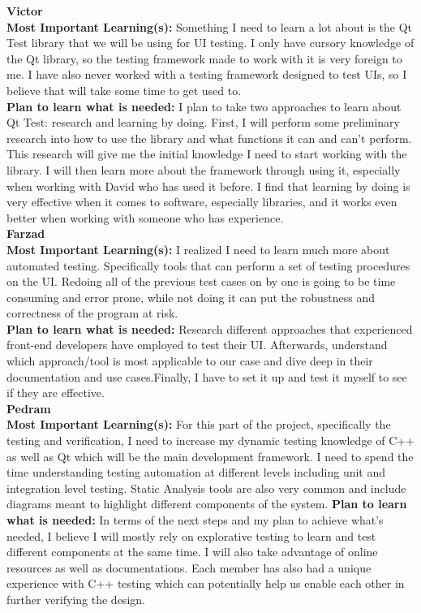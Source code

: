 \documentclass[12pt, titlepage]{article}
\begin{document}
\noindent\textbf{Victor}\\
\textbf{Most Important Learning(s):} Something I need to learn a lot about is the Qt Test library that we will be using for UI testing. I only have cursory knowledge of the Qt library, so the testing framework made to work with it is very foreign to me. I have also never worked with a testing framework designed to test UIs, so I believe that will take some time to get used to.\\
\textbf{Plan to learn what is needed:} I plan to take two approaches to learn about Qt Test: research and learning by doing. First, I will perform some preliminary research into how to use the library and what functions it can and can't perform. This research will give me the initial knowledge I need to start working with the library. I will then learn more about the framework through using it, especially when working with David who has used it before. I find that learning by doing is very effective when it comes to software, especially libraries, and it works even better when working with someone who has experience.\\

\noindent\textbf{Farzad}\\
\textbf{Most Important Learning(s):} I realized I need to learn much more about automated testing. Specifically tools that can perform a set of testing procedures on the UI. Redoing all of the previous test cases on by one is going to be time consuming and error prone, while not doing it can put the robustness and correctness of the program at risk. \\
\textbf{Plan to learn what is needed:} Research different approaches that experienced front-end developers have employed to test their UI. Afterwards, understand which approach/tool is most applicable to our case and dive deep in their documentation and use cases.Finally, I have to set it up and test it myself to see if they are effective.\\

\noindent\textbf{Pedram}\\
\textbf{Most Important Learning(s):} For this part of the project, specifically the testing and verification, I need to increase my dynamic testing knowledge of C++ as well as Qt which will be the main development framework. I need to spend the time understanding testing automation at different levels including unit and integration level testing. Static Analysis tools are also very common and include diagrams meant to highlight different components of the system. 
\textbf{Plan to learn what is needed:} In terms of the next steps and my plan to achieve what’s needed, I believe I will mostly rely on explorative testing to learn and test different components at the same time. I will also take advantage of online resources as well as documentations. Each member has also had a unique experience with C++ testing which can potentially help us enable each other in further verifying the design. 
\end{document}
